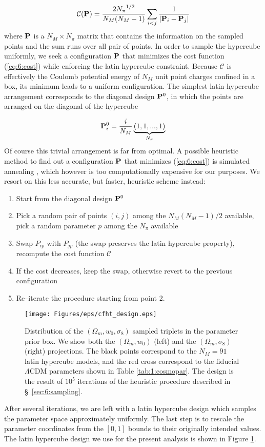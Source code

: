 \begin{equation}
\label{eq:6:cost}
\mathcal{C}(\mathbf{P}) = \frac{2{N_\pi}^{1/2}}{N_M(N_M-1)}\sum_{i<j} \frac{1}{\vert \mathbf{P}_i-\mathbf{P}_j \vert}
\end{equation} 
%
where $\mathbf{P}$ is a $N_M\times N_\pi$ matrix that contains the information on the sampled points and the sum runs over all pair of points. In order to sample the hypercube uniformly, we seek a configuration $\mathbf{P}$ that minimizes the cost function (\ref{eq:6:cost}) while enforcing the latin hypercube constraint. Because $\mathcal{C}$ is effectively the Coulomb potential energy of $N_M$ unit point charges confined in a box, its minimum leads to a uniform configuration. The simplest latin hypercube arrangement corresponds to the diagonal design $\mathbf{P}^0$, in which the points are arranged on the diagonal of the hypercube

\begin{equation}
\label{eq:6:diagonal}
\mathbf{P}^0_{i} = \frac{i}{N_M}\underbrace{(1,1,...,1)}_{N_\pi}
\end{equation}
%  
Of course this trivial arrangement is far from optimal. A possible heuristic method to find out a configuration $\mathbf{P}$ that minimizes (\ref{eq:6:cost}) is simulated annealing \citep{Skiena}, which however is too computationally expensive for our purposes. We resort on this less accurate, but faster, heuristic scheme instead: 
\begin{enumerate}
\item Start from the diagonal design $\mathbf{P}^0$
\item Pick a random pair of points $(i,j)$ among the $N_M(N_M-1)/2$ available, pick a random parameter $p$ among the $N_\pi$ available
\item Swap $P_{ip}$ with $P_{jp}$ (the swap preserves the latin hypercube property), recompute the cost function $\mathcal{C}$
\item If the cost decreases, keep the swap, otherwise revert to the previous configuration
\item Re--iterate the procedure starting from point 2. 
\end{enumerate}
%
\begin{figure}
\begin{center}
\texttt{[image: Figures/eps/cfht\_design.eps]}
\end{center}
\caption{Distribution of the $(\Omega_m,w_0,\sigma_8)$ sampled triplets in the parameter prior box. We show both the $(\Omega_m,w_0)$ (left) and the $(\Omega_m,\sigma_8)$ (right) projections. The black points correspond to the $N_M=91$ latin hypercube models, and the red cross correspond to the fiducial $\Lambda$CDM parameters shown in Table \ref{tab:1:cosmopar}. The design is the result of $10^5$ iterations of the heuristic procedure described in \S~\ref{sec:6:sampling}.}
\label{fig:6:sampling}
\end{figure}
%
After several iterations, we are left with a latin hypercube design which samples the parameter space approximately uniformly. The last step is to rescale the parameter coordinates from the $[0,1]$ bounds to their originally intended values. The latin hypercube design we use for the present analysis is shown in Figure \ref{fig:6:sampling}. 

